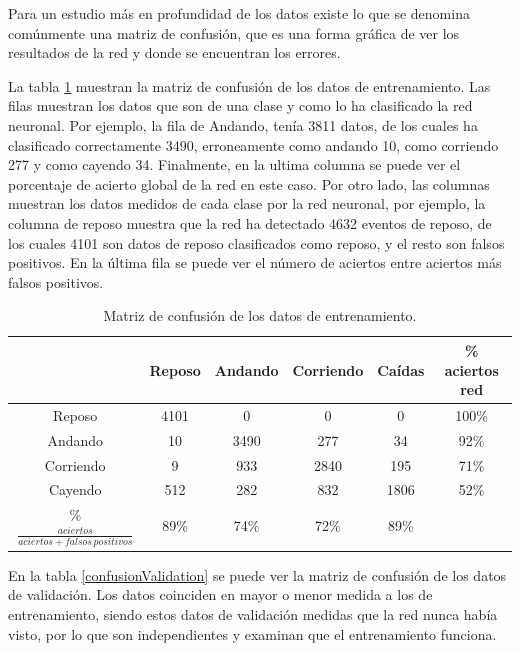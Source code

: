 \documentclass[12pt]{book}
\numberwithin{equation}{section}
\begin{document}
Para un estudio más en profundidad de los datos existe lo que se denomina comúnmente una matriz de confusión, que es una forma gráfica de ver los resultados de la red y donde se encuentran los errores.

La tabla \ref{confusionTraining} muestran la matriz de confusión de los datos de entrenamiento. Las filas muestran los datos que son de una clase y como lo ha clasificado la red neuronal. Por ejemplo, la fila de Andando, tenía 3811 datos, de los cuales ha clasificado correctamente 3490, erroneamente como andando 10, como corriendo 277 y como cayendo 34. Finalmente, en la ultima columna se puede ver el porcentaje de acierto global de la red en este caso. Por otro lado, las columnas muestran los datos medidos de cada clase por la red neuronal, por ejemplo, la columna de reposo muestra que la red ha detectado 4632 eventos de reposo, de los cuales 4101 son datos de reposo clasificados como reposo, y el resto son falsos positivos. En la última fila se puede ver el número de aciertos entre aciertos más falsos positivos.


\begin{table}[h]
\begin{small}
\centering
\begin{tabular} {| c || c | c | c | c || c |}
  \hline
   & Reposo & Andando & Corriendo & Caídas & \% aciertos red\\
  \hline
  \hline
  Reposo & \cellcolor{green!25}4101 & 0 & 0 & 0 & 100\% \\
  \hline
  Andando & 10 & \cellcolor{green!25}3490 & 277 & 34 & 92\% \\
  \hline
  Corriendo & 9 & 933 & \cellcolor{green!25}2840 & 195 & 71\% \\
  \hline
  Cayendo & 512 & 282 & 832 & \cellcolor{green!25}1806 & 52\% \\
  \hline
  \hline
  \% $\frac{aciertos}{aciertos + falsos \, positivos}$ & 89\% & 74\% & 72\% & 89\% & \\
  \hline
\end{tabular}
\caption{Matriz de confusión de los datos de entrenamiento.}
\label{confusionTraining}
\end{small}
\end{table}

En la tabla \ref{confusionValidation} se puede ver la matriz de confusión de los datos de validación. Los datos coinciden en mayor o menor medida a los de entrenamiento, siendo estos datos de validación medidas que la red nunca había visto, por lo que son independientes y examinan que el entrenamiento funciona.
\end{document}
